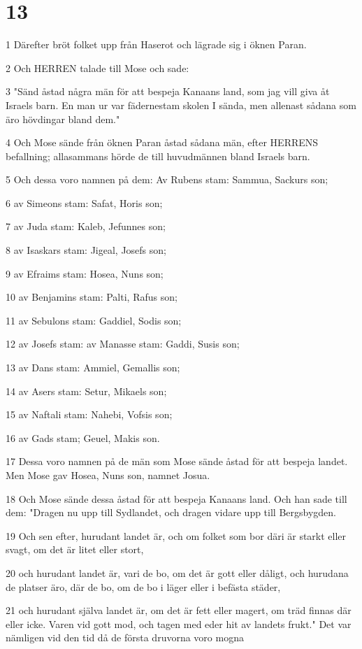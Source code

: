 \chapter{13}

\par 1 Därefter bröt folket upp från Haserot och lägrade sig i öknen Paran.
\par 2 Och HERREN talade till Mose och sade:
\par 3 "Sänd åstad några män för att bespeja Kanaans land, som jag vill giva åt Israels barn. En man ur var fädernestam skolen I sända, men allenast sådana som äro hövdingar bland dem."
\par 4 Och Mose sände från öknen Paran åstad sådana män, efter HERRENS befallning; allasammans hörde de till huvudmännen bland Israels barn.
\par 5 Och dessa voro namnen på dem: Av Rubens stam: Sammua, Sackurs son;
\par 6 av Simeons stam: Safat, Horis son;
\par 7 av Juda stam: Kaleb, Jefunnes son;
\par 8 av Isaskars stam: Jigeal, Josefs son;
\par 9 av Efraims stam: Hosea, Nuns son;
\par 10 av Benjamins stam: Palti, Rafus son;
\par 11 av Sebulons stam: Gaddiel, Sodis son;
\par 12 av Josefs stam: av Manasse stam: Gaddi, Susis son;
\par 13 av Dans stam: Ammiel, Gemallis son;
\par 14 av Asers stam: Setur, Mikaels son;
\par 15 av Naftali stam: Nahebi, Vofsis son;
\par 16 av Gads stam; Geuel, Makis son.
\par 17 Dessa voro namnen på de män som Mose sände åstad för att bespeja landet. Men Mose gav Hosea, Nuns son, namnet Josua.
\par 18 Och Mose sände dessa åstad för att bespeja Kanaans land. Och han sade till dem: "Dragen nu upp till Sydlandet, och dragen vidare upp till Bergsbygden.
\par 19 Och sen efter, hurudant landet är, och om folket som bor däri är starkt eller svagt, om det är litet eller stort,
\par 20 och hurudant landet är, vari de bo, om det är gott eller dåligt, och hurudana de platser äro, där de bo, om de bo i läger eller i befästa städer,
\par 21 och hurudant själva landet är, om det är fett eller magert, om träd finnas där eller icke. Varen vid gott mod, och tagen med eder hit av landets frukt." Det var nämligen vid den tid då de första druvorna voro mogna
